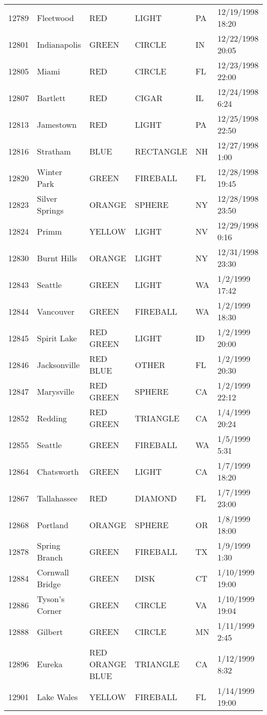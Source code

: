 \begin{tabular}{llllll}
12789 & Fleetwood & RED & LIGHT & PA & 12/19/1998 18:20 \\
12801 & Indianapolis & GREEN & CIRCLE & IN & 12/22/1998 20:05 \\
12805 & Miami & RED & CIRCLE & FL & 12/23/1998 22:00 \\
12807 & Bartlett & RED & CIGAR & IL & 12/24/1998 6:24 \\
12813 & Jamestown & RED & LIGHT & PA & 12/25/1998 22:50 \\
12816 & Stratham & BLUE & RECTANGLE & NH & 12/27/1998 1:00 \\
12820 & Winter Park & GREEN & FIREBALL & FL & 12/28/1998 19:45 \\
12823 & Silver Springs & ORANGE & SPHERE & NY & 12/28/1998 23:50 \\
12824 & Primm & YELLOW & LIGHT & NV & 12/29/1998 0:16 \\
12830 & Burnt Hills & ORANGE & LIGHT & NY & 12/31/1998 23:30 \\
12843 & Seattle & GREEN & LIGHT & WA & 1/2/1999 17:42 \\
12844 & Vancouver & GREEN & FIREBALL & WA & 1/2/1999 18:30 \\
12845 & Spirit Lake & RED GREEN & LIGHT & ID & 1/2/1999 20:00 \\
12846 & Jacksonville & RED BLUE & OTHER & FL & 1/2/1999 20:30 \\
12847 & Marysville & RED GREEN & SPHERE & CA & 1/2/1999 22:12 \\
12852 & Redding & RED GREEN & TRIANGLE & CA & 1/4/1999 20:24 \\
12855 & Seattle & GREEN & FIREBALL & WA & 1/5/1999 5:31 \\
12864 & Chatsworth & GREEN & LIGHT & CA & 1/7/1999 18:20 \\
12867 & Tallahassee & RED & DIAMOND & FL & 1/7/1999 23:00 \\
12868 & Portland & ORANGE & SPHERE & OR & 1/8/1999 18:00 \\
12878 & Spring Branch & GREEN & FIREBALL & TX & 1/9/1999 1:30 \\
12884 & Cornwall Bridge & GREEN & DISK & CT & 1/10/1999 19:00 \\
12886 & Tyson's Corner & GREEN & CIRCLE & VA & 1/10/1999 19:04 \\
12888 & Gilbert & GREEN & CIRCLE & MN & 1/11/1999 2:45 \\
12896 & Eureka & RED ORANGE BLUE & TRIANGLE & CA & 1/12/1999 8:32 \\
12901 & Lake Wales & YELLOW & FIREBALL & FL & 1/14/1999 19:00 \\

\end{tabular}
